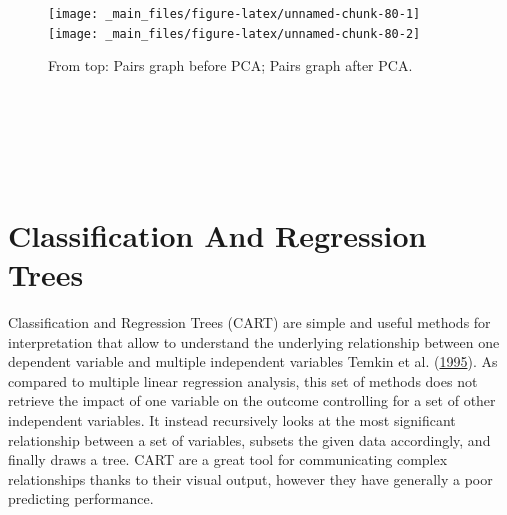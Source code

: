 \documentclass[
]{svmono}
\newenvironment{Shaded}{\begin{snugshade}}{\end{snugshade}}
\newcommand{\AttributeTok}[1]{\textcolor[rgb]{0.13,0.29,0.53}{#1}}
\newcommand{\CommentTok}[1]{\textcolor[rgb]{0.56,0.35,0.01}{\textit{#1}}}
\newcommand{\FunctionTok}[1]{\textcolor[rgb]{0.13,0.29,0.53}{\textbf{#1}}}
\newcommand{\NormalTok}[1]{#1}
\newcommand{\SpecialCharTok}[1]{\textcolor[rgb]{0.81,0.36,0.00}{\textbf{#1}}}
\newcommand{\StringTok}[1]{\textcolor[rgb]{0.31,0.60,0.02}{#1}}
\begin{document}
\begin{Shaded}
\end{Shaded}

\begin{figure}[H]
\texttt{[image: \_main\_files/figure-latex/unnamed-chunk-80-1]} \texttt{[image: \_main\_files/figure-latex/unnamed-chunk-80-2]} \caption{From top: Pairs graph before PCA; Pairs graph after PCA.}\label{fig:unnamed-chunk-80}
\end{figure}

~

~

~

\hypertarget{classification-and-regression-trees}{%
\section{Classification And Regression Trees}\label{classification-and-regression-trees}}

Classification and Regression Trees (CART) are simple and useful methods
for interpretation that allow to understand the underlying relationship
between one dependent variable and multiple independent variables
Temkin et al. (\protect\hyperlink{ref-temkin1995}{1995}). As compared to multiple linear regression
analysis, this set of methods does not retrieve the impact of one
variable on the outcome controlling for a set of other independent
variables. It instead recursively looks at the most significant
relationship between a set of variables, subsets the given data
accordingly, and finally draws a tree. CART are a great tool for
communicating complex relationships thanks to their visual output,
however they have generally a poor predicting performance.
\end{document}
